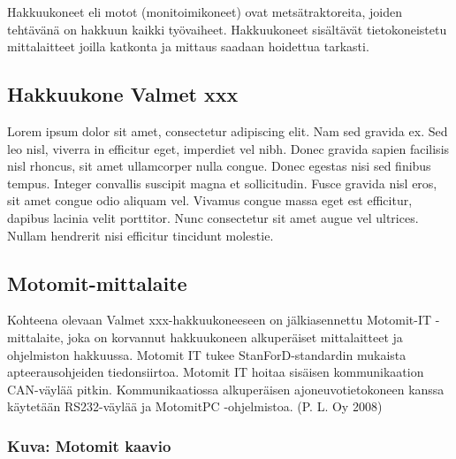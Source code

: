 \documentclass[]{article}
\begin{document}
Hakkuukoneet eli motot (monitoimikoneet) ovat metsätraktoreita, joiden
tehtävänä on hakkuun kaikki työvaiheet. Hakkuukoneet sisältävät
tietokoneistetu mittalaitteet joilla katkonta ja mittaus saadaan
hoidettua tarkasti.

\subsection{Hakkuukone Valmet xxx}\label{hakkuukone-valmet-xxx}

Lorem ipsum dolor sit amet, consectetur adipiscing elit. Nam sed gravida
ex. Sed leo nisl, viverra in efficitur eget, imperdiet vel nibh. Donec
gravida sapien facilisis nisl rhoncus, sit amet ullamcorper nulla
congue. Donec egestas nisi sed finibus tempus. Integer convallis
suscipit magna et sollicitudin. Fusce gravida nisl eros, sit amet congue
odio aliquam vel. Vivamus congue massa eget est efficitur, dapibus
lacinia velit porttitor. Nunc consectetur sit amet augue vel ultrices.
Nullam hendrerit nisi efficitur tincidunt molestie.

\subsection{Motomit-mittalaite}\label{motomit-mittalaite}

Kohteena olevaan Valmet xxx-hakkuukoneeseen on jälkiasennettu Motomit-IT
-mittalaite, joka on korvannut hakkuukoneen alkuperäiset mittalaitteet
ja ohjelmiston hakkuussa. Motomit IT tukee StanForD-standardin mukaista
apteerausohjeiden tiedonsiirtoa. Motomit IT hoitaa sisäisen
kommunikaation CAN-väylää pitkin. Kommunikaatiossa alkuperäisen
ajoneuvotietokoneen kanssa käytetään RS232-väylää ja MotomitPC
-ohjelmistoa. (P. L. Oy 2008)

\subsubsection{Kuva: Motomit kaavio}\label{Motomitux5fkaavio}
\end{document}
